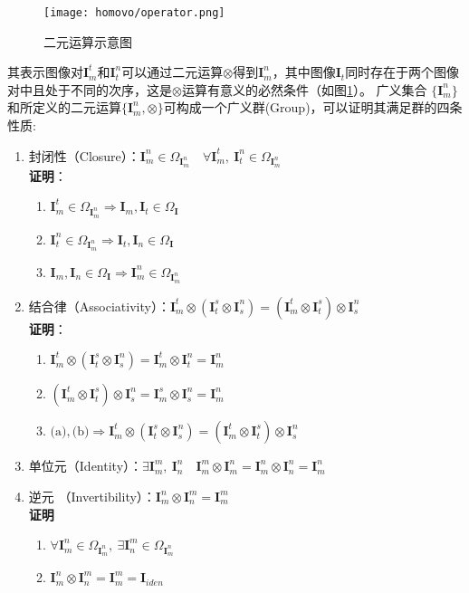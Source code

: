 \begin{figure}
    \centering
    \texttt{[image: homovo/operator.png]}
    \caption{二元运算示意图}
    \label{fig:homo_operator}
\end{figure}
其表示图像对$\mathbf{I}_m^t$和$\mathbf{I}_t^n$可以通过二元运算$\otimes$得到$\mathbf{I}_m^n$，其中图像$\mathbf{I}_t$同时存在于两个图像对中且处于不同的次序，这是$\otimes$运算有意义的必然条件（如图\ref{fig:homo_operator}）。
广义集合 $\{\mathbf{I}_m^n\}$和所定义的二元运算$\{\mathbf{I}_m^n,\otimes\}$可构成一个广义群(Group)，可以证明其满足群的四条性质: 
\begin{enumerate}
    \item 封闭性（Closure）：$\mathbf{I}_m^n \in \Omega_{\mathbf{I}_m^n}\quad \forall \mathbf{I}_m^t,\ \mathbf{I}_t^n \in  \Omega_{\mathbf{I}_m^n}$ \\
    \textbf{证明}： 
    \begin{enumerate}
        \item $\mathbf{I}_m^t \in \Omega_{\mathbf{I}_m^n} \Rightarrow \mathbf{I}_m, \mathbf{I}_t \in \Omega_{\mathbf{I}}$
        \item $\mathbf{I}_t^n \in \Omega_{\mathbf{I}_m^n} \Rightarrow \mathbf{I}_t, \mathbf{I}_n \in \Omega_{\mathbf{I}}$
        \item $\mathbf{I}_m, \mathbf{I}_n \in \Omega_{\mathbf{I}}\Rightarrow  \mathbf{I}_m^n \in \Omega_{\mathbf{I}_m^n} $
    \end{enumerate}
    \item 结合律（Associativity）：$\mathbf{I}_m^t\otimes (\mathbf{I}_t^s \otimes \mathbf{I}_s^n) = (\mathbf{I}_m^t \otimes \mathbf{I}_t^s )\otimes \mathbf{I}_s^n $\\
    \textbf{证明}：
    \begin{enumerate}
        \item $\mathbf{I}_m^t\otimes (\mathbf{I}_t^s \otimes \mathbf{I}_s^n) = \mathbf{I}_m^t\otimes \mathbf{I}_t^n = \mathbf{I}_m^n$ 
        \item $(\mathbf{I}_m^t \otimes \mathbf{I}_t^s )\otimes \mathbf{I}_s^n = \mathbf{I}_m^s\otimes \mathbf{I}_s^n = \mathbf{I}_m^n$
        \item $\text{(a)},\text{(b)} \Rightarrow \mathbf{I}_m^t\otimes (\mathbf{I}_t^s \otimes \mathbf{I}_s^n) = (\mathbf{I}_m^t \otimes \mathbf{I}_t^s )\otimes \mathbf{I}_s^n$
    \end{enumerate}
    \item 单位元（Identity）：$\exists \mathbf{I}_m^m,\ \mathbf{I}_n^n \quad  \mathbf{I}_m^m \otimes \mathbf{I}_m^n = \mathbf{I}_m^n\otimes \mathbf{I}_n^n = \mathbf{I}_m^n$
    \item 逆元 （Invertibility）：$\mathbf{I}_m^n\otimes \mathbf{I}_n^m = \mathbf{I}_m^m$\\
    \textbf{证明}
    \begin{enumerate}
        \item $\forall \mathbf{I}_m^n \in \Omega_{\mathbf{I}_m^n},\  \exists  \mathbf{I}_n^m \in \Omega_{\mathbf{I}_m^n}$
        \item $\mathbf{I}_m^n\otimes \mathbf{I}_n^m = \mathbf{I}_m^m = \mathbf{I}_{iden}$
    \end{enumerate}
\end{enumerate}

